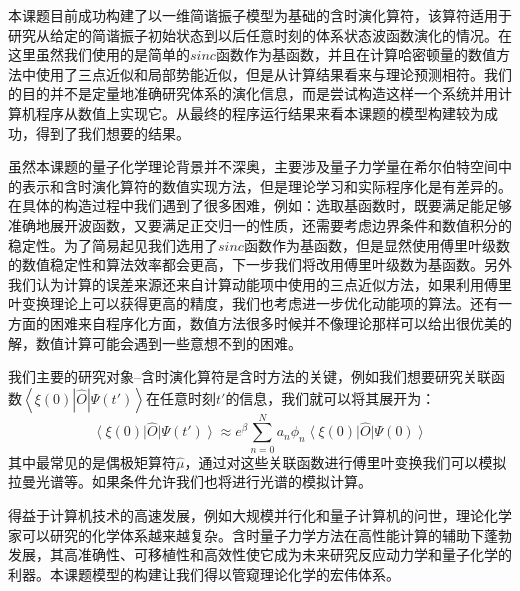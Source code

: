 
本课题目前成功构建了以一维简谐振子模型为基础的含时演化算符，该算符适用于研究从给定的简谐振子初始状态到以后任意时刻的体系状态波函数演化的情况。在这里虽然我们使用的是简单的$sinc$函数作为基函数，并且在计算哈密顿量的数值方法中使用了三点近似和局部势能近似，但是从计算结果看来与理论预测相符。我们的目的并不是定量地准确研究体系的演化信息，而是尝试构造这样一个系统并用计算机程序从数值上实现它。从最终的程序运行结果来看本课题的模型构建较为成功，得到了我们想要的结果。

虽然本课题的量子化学理论背景并不深奥，主要涉及量子力学量在希尔伯特空间中的表示和含时演化算符的数值实现方法，但是理论学习和实际程序化是有差异的。在具体的构造过程中我们遇到了很多困难，例如：选取基函数时，既要满足能足够准确地展开波函数，又要满足正交归一的性质，还需要考虑边界条件和数值积分的稳定性。为了简易起见我们选用了$sinc$函数作为基函数，但是显然使用傅里叶级数的数值稳定性和算法效率都会更高，下一步我们将改用傅里叶级数为基函数。另外我们认为计算的误差来源还来自计算动能项中使用的三点近似方法，如果利用傅里叶变换理论上可以获得更高的精度，我们也考虑进一步优化动能项的算法。还有一方面的困难来自程序化方面，数值方法很多时候并不像理论那样可以给出很优美的解，数值计算可能会遇到一些意想不到的困难。

我们主要的研究对象--含时演化算符是含时方法的关键，例如我们想要研究关联函数$\left< \xi(0) | \hat{O} | \Psi(t') \right>$在任意时刻$t'$的信息，我们就可以将其展开为：
\begin{equation*}
  \left< \xi(0) \right| \hat{O} \left| \Psi(t') \right> \approx e^{\beta} \sum_{n=0}^N a_n \phi_n \left< \xi(0)\right| \hat{O} \left| \Psi(0) \right>
\end{equation*}
其中最常见的是偶极矩算符$\hat{\mu}$，通过对这些关联函数进行傅里叶变换我们可以模拟拉曼光谱等。如果条件允许我们也将进行光谱的模拟计算。

得益于计算机技术的高速发展，例如大规模并行化和量子计算机的问世，理论化学家可以研究的化学体系越来越复杂。含时量子力学方法在高性能计算的辅助下蓬勃发展，其高准确性、可移植性和高效性使它成为未来研究反应动力学和量子化学的利器。本课题模型的构建让我们得以管窥理论化学的宏伟体系。
